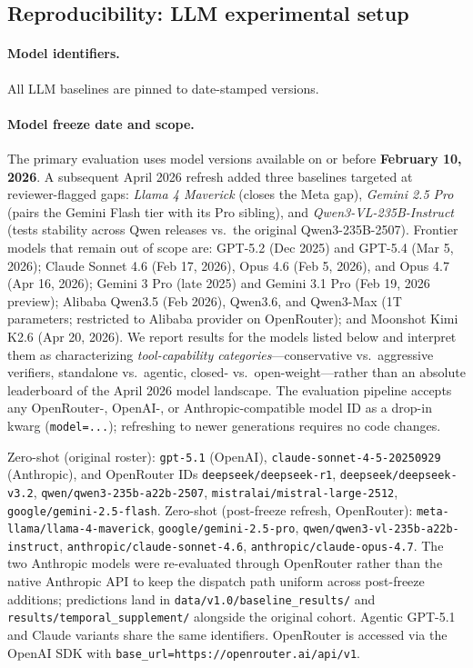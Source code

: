 \subsection{Reproducibility: LLM experimental setup}
\label{app:llm-setup}

\paragraph{Model identifiers.}
All LLM baselines are pinned to date-stamped versions.
\paragraph{Model freeze date and scope.}
The primary evaluation uses model versions available on or before
\textbf{February 10, 2026}. A subsequent April 2026 refresh added
three baselines targeted at reviewer-flagged gaps: \emph{Llama 4
Maverick} (closes the Meta gap), \emph{Gemini 2.5 Pro} (pairs the
Gemini Flash tier with its Pro sibling), and \emph{Qwen3-VL-235B-Instruct}
(tests stability across Qwen releases vs.\ the original Qwen3-235B-2507).
Frontier models that remain out of scope are: GPT-5.2 (Dec 2025) and
GPT-5.4 (Mar 5, 2026); Claude Sonnet 4.6 (Feb 17, 2026), Opus 4.6
(Feb 5, 2026), and Opus 4.7 (Apr 16, 2026); Gemini 3 Pro (late 2025)
and Gemini 3.1 Pro (Feb 19, 2026 preview); Alibaba Qwen3.5 (Feb 2026),
Qwen3.6, and Qwen3-Max (1T parameters; restricted to Alibaba provider
on OpenRouter); and Moonshot Kimi K2.6 (Apr 20, 2026). We report results
for the models listed below and interpret them as characterizing
\emph{tool-capability categories}---conservative vs.\ aggressive
verifiers, standalone vs.\ agentic, closed- vs.\ open-weight---rather
than an absolute leaderboard of the April 2026 model landscape. The
evaluation pipeline accepts any OpenRouter-, OpenAI-, or
Anthropic-compatible model ID as a drop-in kwarg (\texttt{model=...});
refreshing to newer generations requires no code changes.

Zero-shot (original roster): \texttt{gpt-5.1} (OpenAI), \texttt{claude-sonnet-4-5-20250929} (Anthropic), and OpenRouter IDs \texttt{deepseek/deepseek-r1}, \texttt{deepseek/deepseek-v3.2}, \texttt{qwen/qwen3-235b-a22b-2507}, \texttt{mistralai/mistral-large-2512}, \texttt{google/gemini-2.5-flash}.
Zero-shot (post-freeze refresh, OpenRouter): \texttt{meta-llama/llama-4-maverick}, \texttt{google/gemini-2.5-pro}, \texttt{qwen/qwen3-vl-235b-a22b-instruct}, \texttt{anthropic/claude-sonnet-4.6}, \texttt{anthropic/claude-opus-4.7}.
The two Anthropic models were re-evaluated through OpenRouter rather than the native Anthropic API to keep the dispatch path uniform across post-freeze additions; predictions land in \texttt{data/v1.0/baseline\_results/} and \texttt{results/temporal\_supplement/} alongside the original cohort.
Agentic GPT-5.1 and Claude variants share the same identifiers.
OpenRouter is accessed via the OpenAI SDK with \texttt{base\_url=https://openrouter.ai/api/v1}.

